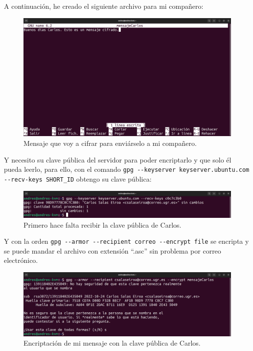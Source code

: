 \documentclass{article}
\begin{document}
A continuación, he creado el siguiente archivo para mi compañero:

\begin{figure}[H]
    \includegraphics[width=\textwidth]{imagenes/Portatil/Captura desde 2022-10-24 12-02-33.png}
    \caption{Mensaje que voy a cifrar para enviárselo a mi compañero.}
\end{figure}

Y necesito su clave pública del servidor para poder encriptarlo y que solo él pueda leerlo, para ello, con el comando \verb|gpg --keyserver keyserver.ubuntu.com --recv-keys SHORT_ID| obtengo su clave pública:

\begin{figure}[H]
    \includegraphics[width=\textwidth]{imagenes/Portatil/Captura desde 2022-10-24 12-11-03.png}
    \caption{Primero hace falta recibir la clave pública de Carlos.}
\end{figure}

Y con la orden \verb|gpg --armor --recipient correo --encrypt file| se encripta y se puede mandar el archivo con extensión ``.asc'' sin problema por correo electrónico.

\begin{figure}[H]
    \includegraphics[width=\textwidth]{imagenes/Portatil/Captura desde 2022-10-24 12-11-31.png}
    \caption{Encriptación de mi mensaje con la clave pública de Carlos.}
\end{figure}
\end{document}
